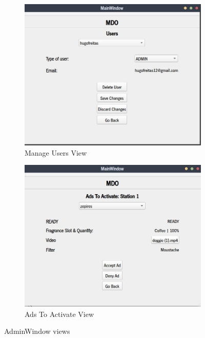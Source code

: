 \begin{figure}[htb!]
%
  \begin{subfigure}{.4\textwidth}
    \includegraphics[width=\textwidth]{img/admin-manage-users-view.jpg}%
  \caption{Manage Users View}%
  \label{fig:admin-manage-users-view}
  \end{subfigure}
  \begin{subfigure}{.4\textwidth}
    \includegraphics[width=\textwidth]{img/admin-ads-to-act.jpg}%
  \caption{Ads To Activate View}%
  \label{fig:admin-ads-to-act-view}
  \end{subfigure}
  \caption{AdminWindow views}%
  \label{fig:ptp-test}
\end{figure} 
